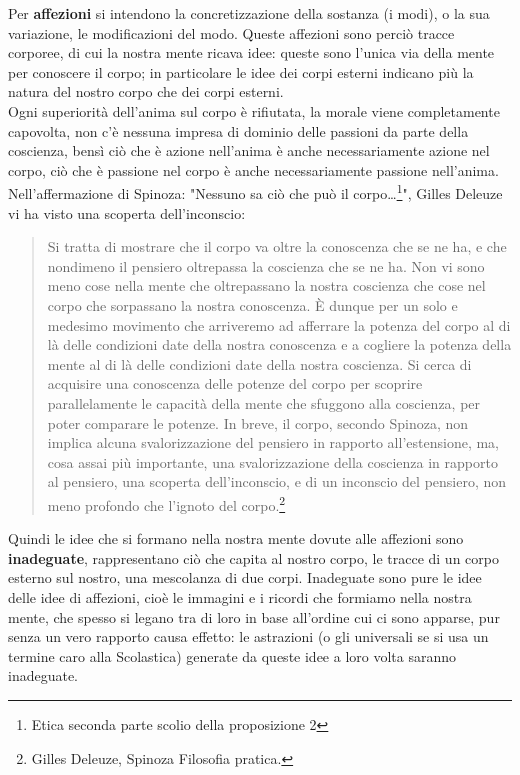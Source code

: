 Per \textbf{affezioni} si intendono la concretizzazione della sostanza (i modi), o la sua variazione, le modificazioni del modo. Queste affezioni sono perciò tracce corporee, di cui la nostra mente ricava idee: queste sono l'unica via della mente per conoscere il corpo; in particolare le idee dei corpi esterni indicano più la natura del nostro corpo che dei corpi esterni.\\
Ogni superiorità dell'anima sul corpo è rifiutata, la morale viene completamente capovolta, non c'è nessuna impresa di dominio delle passioni da parte della coscienza, bensì ciò che è azione nell’anima è anche necessariamente azione nel corpo, ciò che è passione nel corpo è anche necessariamente passione nell’anima. Nell'affermazione di Spinoza: "Nessuno sa ciò che può il corpo…\footnote{Etica seconda parte scolio della proposizione 2}", Gilles Deleuze vi ha visto una scoperta dell'inconscio:

\begin{quotation}
	\small Si tratta di mostrare che il corpo va oltre la conoscenza che se ne ha, e che nondimeno il pensiero oltrepassa la coscienza che se ne ha. Non vi sono meno cose nella mente che oltrepassano la nostra coscienza che cose nel corpo che sorpassano la nostra conoscenza. È dunque per un solo e medesimo movimento che arriveremo ad afferrare la potenza del corpo al di là delle condizioni date della nostra conoscenza e a cogliere la potenza della mente al di là delle condizioni date della nostra coscienza. Si cerca di acquisire una conoscenza delle potenze del corpo per scoprire parallelamente le capacità della mente che sfuggono alla coscienza, per poter comparare le potenze. In breve, il corpo, secondo Spinoza, non implica alcuna svalorizzazione del pensiero in rapporto all’estensione, ma, cosa assai più importante, una svalorizzazione della coscienza in rapporto al pensiero, una scoperta dell’inconscio, e di un inconscio del pensiero, non meno profondo che l’ignoto del corpo.\footnote{Gilles Deleuze, Spinoza Filosofia pratica.}
\end{quotation}

Quindi le idee che si formano nella nostra mente dovute alle affezioni sono \textbf{inadeguate}, rappresentano ciò che capita al nostro corpo, le tracce di un corpo esterno sul nostro, una mescolanza di due corpi. Inadeguate sono pure le idee delle idee di affezioni, cioè le immagini e i ricordi che formiamo nella nostra mente, che spesso si legano tra di loro in base all'ordine cui ci sono apparse, pur senza un vero rapporto causa effetto: le astrazioni (o gli universali se si usa un termine caro alla Scolastica) generate da queste idee a loro volta saranno inadeguate.

